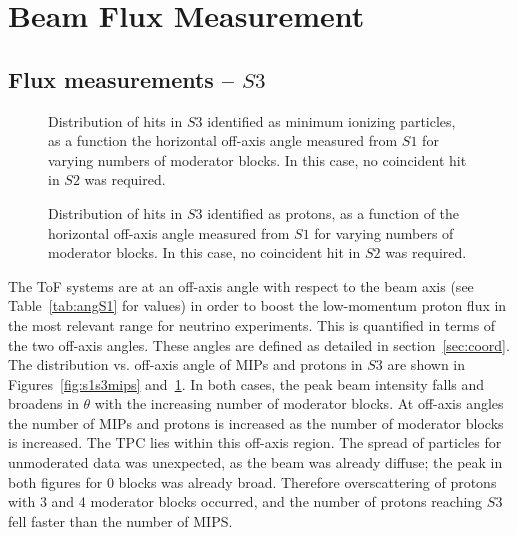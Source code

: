 \section{Beam Flux Measurement}
\label{hptpcPaper:sec:Results}

\subsection{Flux measurements -- $\mathit{S3}$}

\begin{figure}[h]
  \begin{minipage}{0.48\textwidth}
    \begin{adjustbox}{max totalsize={\textwidth}{.35\textheight},center}
      
    \end{adjustbox}
    \caption{Distribution of hits in $\mathit{S3}$ identified as minimum ionizing particles, as a function the horizontal off-axis angle measured from $\mathit{S1}$ for varying numbers of moderator blocks. In this case, no coincident hit in $\mathit{S2}$ was required.}
    \label{fig:s1s3mips}
  \end{minipage}
  \hspace{0.3cm}
  \begin{minipage}{0.48\textwidth}
    \begin{adjustbox}{max totalsize={\textwidth}{.35\textheight},center}
      
    \end{adjustbox}
    \caption{Distribution of hits in $\mathit{S3}$ identified as protons, as a function of the horizontal off-axis angle measured from $\mathit{S1}$ for varying numbers of moderator blocks. In this case, no coincident hit in $\mathit{S2}$ was required.}
    \label{fig:s1s3protons}
  \end{minipage}
\end{figure}

The ToF systems are at an off-axis angle with respect to the beam axis (see Table~\ref{tab:angS1} for values) in order to boost the low-momentum proton flux in the most relevant range for neutrino experiments.
This is quantified in terms of the two off-axis angles.
These angles are defined as detailed in section~\ref{sec:coord}.
The distribution vs. off-axis angle of MIPs and protons in $\mathit{S3}$ are shown in Figures~\ref{fig:s1s3mips} and~\ref{fig:s1s3protons}.
In both cases, the peak beam intensity falls and broadens in $\theta$ with the increasing number of moderator blocks. 
At off-axis angles the number of MIPs and protons is increased as the number of moderator blocks is increased.
The TPC lies within this off-axis region.
The spread of particles for unmoderated data was unexpected, as the beam was already diffuse; the peak in both figures for 0 blocks was already broad.
Therefore overscattering of protons with 3 and 4 moderator blocks occurred, and the number of protons reaching $\mathit{S3}$ fell faster than the number of MIPS.

